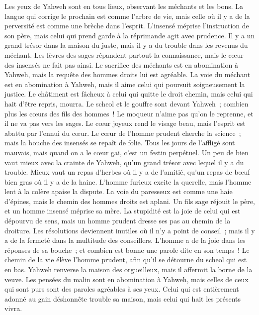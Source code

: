 \begin{multicols}{2}
Les yeux de Yahweh sont en tous lieux, observant les méchants et les bons.
La langue qui corrige le prochain est comme l'arbre de vie, mais celle où il y a de la perversité est comme une brèche dans l'esprit.
L'insensé méprise l'instruction de son père, mais celui qui prend garde à la réprimande agit avec prudence.
Il y a un grand trésor dans la maison du juste, mais il y a du trouble dans les revenus du méchant.
Les lèvres des sages répandent partout la connaissance, mais le cœur des insensés ne fait pas ainsi.
Le sacrifice des méchants est en abomination à Yahweh, mais la requête des hommes droits lui est agréable.
La voie du méchant est en abomination à Yahweh, mais il aime celui qui poursuit soigneusement la justice.
Le châtiment est fâcheux à celui qui quitte le droit chemin, mais celui qui hait d'être repris, mourra.
Le scheol et le gouffre sont devant Yahweh~; combien plus les cœurs des fils des hommes~!
Le moqueur n'aime pas qu'on le reprenne, et il ne va pas vers les sages.
Le cœur joyeux rend le visage beau, mais l'esprit est abattu par l'ennui du cœur.
Le cœur de l'homme prudent cherche la science~; mais la bouche des insensés se repaît de folie.
Tous les jours de l'affligé sont mauvais, mais quand on a le cœur gai, c'est un festin perpétuel.
Un peu de bien vaut mieux avec la crainte de Yahweh, qu'un grand trésor avec lequel il y a du trouble.
Mieux vaut un repas d'herbes où il y a de l'amitié, qu'un repas de bœuf bien gras où il y a de la haine.
L'homme furieux excite la querelle, mais l'homme lent à la colère apaise la dispute.
La voie du paresseux est comme une haie d'épines, mais le chemin des hommes droits est aplani.
Un fils sage réjouit le père, et un homme insensé méprise sa mère.
La stupidité est la joie de celui qui est dépourvu de sens, mais un homme prudent dresse ses pas au chemin de la droiture.
 Les résolutions deviennent inutiles où il n'y a point de conseil~; mais il y a de la fermeté dans la multitude des conseillers.
L'homme a de la joie dans les réponses de sa bouche~; et combien est bonne une parole dite en son temps~!
Le chemin de la vie élève l'homme prudent, afin qu'il se détourne du scheol qui est en bas.
Yahweh renverse la maison des orgueilleux, mais il affermit la borne de la veuve.
Les pensées du malin sont en abomination à Yahweh, mais celles de ceux qui sont purs sont des paroles agréables à ses yeux.
Celui qui est entièrement adonné au gain déshonnête trouble sa maison, mais celui qui hait les présents vivra.

\end{multicols}
